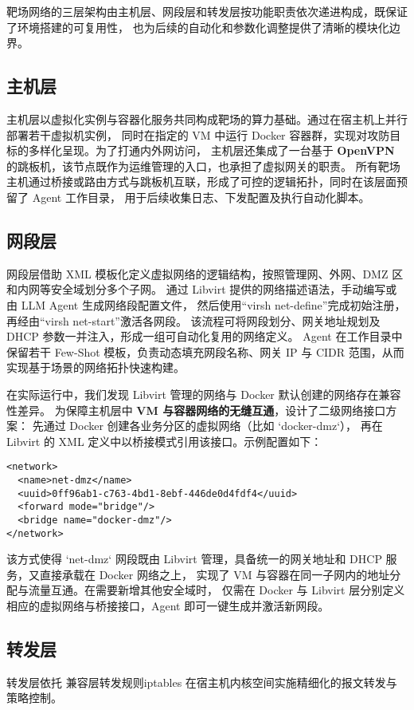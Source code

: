 \documentclass[lang=cn,10pt]{elegantbook}
\begin{document}
靶场网络的三层架构由主机层、网段层和转发层按功能职责依次递进构成，既保证了环境搭建的可复用性，
也为后续的自动化和参数化调整提供了清晰的模块化边界。


\subsection{主机层}
主机层以虚拟化实例与容器化服务共同构成靶场的算力基础。通过在宿主机上并行部署若干虚拟机实例，
同时在指定的 VM 中运行 Docker 容器群，实现对攻防目标的多样化呈现。为了打通内外网访问，
主机层还集成了一台基于 \textbf{OpenVPN }的跳板机，该节点既作为运维管理的入口，也承担了虚拟网关的职责。
所有靶场主机通过桥接或路由方式与跳板机互联，形成了可控的逻辑拓扑，同时在该层面预留了 Agent 工作目录，
用于后续收集日志、下发配置及执行自动化脚本。

\subsection{网段层}
网段层借助 XML 模板化定义虚拟网络的逻辑结构，按照管理网、外网、DMZ 区和内网等安全域划分多个子网。
通过 Libvirt 提供的网络描述语法，手动编写或由 LLM Agent 生成网络段配置文件，
然后使用“virsh net-define”完成初始注册，再经由“virsh net-start”激活各网段。
该流程可将网段划分、网关地址规划及 DHCP 参数一并注入，形成一组可自动化复用的网络定义。
Agent 在工作目录中保留若干 Few-Shot 模板，负责动态填充网段名称、网关 IP 与 CIDR 范围，从而实现基于场景的网络拓扑快速构建。

在实际运行中，我们发现 Libvirt 管理的网络与 Docker 默认创建的网络存在兼容性差异。
为保障主机层中 \textbf{VM 与容器网络的无缝互通}，设计了二级网络接口方案：
先通过 Docker 创建各业务分区的虚拟网络（比如 `docker-dmz`），
再在 Libvirt 的 XML 定义中以桥接模式引用该接口。示例配置如下：

\begin{verbatim}
<network>
  <name>net-dmz</name>
  <uuid>0ff96ab1-c763-4bd1-8ebf-446de0d4fdf4</uuid>
  <forward mode="bridge"/>
  <bridge name="docker-dmz"/>
</network>
\end{verbatim}

该方式使得 `net-dmz` 网段既由 Libvirt 管理，具备统一的网关地址和 DHCP 服务，又直接承载在 Docker 网络之上，
实现了 VM 与容器在同一子网内的地址分配与流量互通。在需要新增其他安全域时，
仅需在 Docker 与 Libvirt 层分别定义相应的虚拟网络与桥接接口，Agent 即可一键生成并激活新网段。

\subsection{转发层}
转发层依托 兼容层转发规则iptables 在宿主机内核空间实施精细化的报文转发与策略控制。
\end{document}
